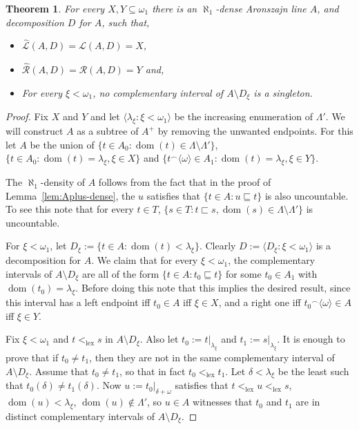 \documentclass[10pt]{amsart}
\newtheorem{theorem}{Theorem}[section]
\theoremstyle{definition}
\theoremstyle{remark}
\newcommand{\seb}{\subseteq}
\newcommand{\setm}{\setminus}
\newcommand{\tup}[1]{\langle#1\rangle}
\renewcommand{\L}{\mathscr{L}}
\newcommand{\R}{\mathscr{R}}
\newcommand{\La}{\hat{\L}}
\newcommand{\Ra}{\hat{\R}}
\newcommand\lex{\mathrm{lex}}
\newcommand{\1}{\mathbbm{1}}
\newcommand{\tleq}{\sqsubseteq}
\newcommand{\tle}{\sqsubset}
\DeclareMathOperator{\dom}{dom}
\begin{document}
\begin{theorem}\label{thm:L_R}
  For every $X,Y \seb \omega_{1}$ there is an $\aleph_{1}$-dense Aronszajn
  line $A$, and decomposition $D$ for $A$, such that,
  \begin{itemize}\itemsep0em
    \item $\La(A,D) = \L(A,D) = X$,
    \item $\Ra(A,D) = \R(A,D) = Y$ and,
    \item For every $\xi < \omega_{1}$, no complementary
    interval of $A \setm D_{\xi}$ is a singleton.
  \end{itemize}
\end{theorem}
\begin{proof}
  Fix $X$ and $Y$ and let $\tup{\lambda_{\xi} : \xi < \omega_{1}}$
  be the increasing enumeration of $\Lambda'$. We
  will construct $A$ as a subtree of $A^{+}$ by removing the unwanted
  endpoints. For this let $A$ be the union of
  $\{t \in A_{0} : \dom(t) \in \Lambda \setm \Lambda ' \}$,
  $\{t \in A_{0} : \dom(t) = \lambda_{\xi}, \xi \in X \}$ and
  $\{t^{\frown}\tup{\omega} \in A_{1} : \dom(t) = \lambda_{\xi}, \xi \in Y\}$.

  The $\aleph_{1}$-density of $A$ follows from the fact that
  in the proof of Lemma~\ref{lem:Aplus-dense}, the $u$ satisfies
  that $\{t \in A : u \tleq t\}$ is also uncountable. To see this note that
  for every $t \in T$, $\{s \in T : t \tle s, \dom(s) \in \Lambda \setm \Lambda'\}$
  is uncountable.

  For $\xi < \omega_{1}$, let $D_{\xi} := \{t \in A : \dom(t) < \lambda_{\xi}\}$.
  Clearly $D := \tup{D_{\xi} : \xi < \omega_{1}}$ is a decomposition for $A$.
  We claim that for every $\xi < \omega_{1}$, the complementary
  intervals of $A \setm D_{\xi}$ are all of the form
  $\{t \in A : t_{0} \tleq t\}$
  for some $t_{0} \in A_{1}$ with $\dom(t_{0}) = \lambda_{\xi}$. Before
  doing this note that this implies the desired result, since
  this interval has a left endpoint iff
  $t_{0} \in A$ iff $\xi \in X$, and a right one iff
  ${t_{0}}^{\frown}\tup{\omega} \in A$ iff $\xi \in Y$.

  Fix $\xi < \omega_{1}$ and $t <_{\lex} s$ in $A \setm D_{\xi}$. Also
  let $t_{0} := t|_{\lambda_{\xi}}$ and $t_{1} := s|_{\lambda_{\xi}}$. It is enough
  to prove that if $t_{0} \neq t_{1}$, then they are not in the same complementary
  interval of $A \setm D_{\xi}$. Assume that $t_{0} \neq t_{1}$, so that in
  fact $t_{0} <_{\lex} t_{1}$. Let $\delta < \lambda_{\xi}$ be the least
  such that $t_{0}(\delta) \neq t_{1}(\delta)$. Now
  $u:= t_{0}|_{\delta + \omega}$ satisfies that $t <_{\lex} u <_{\lex} s$,
  $\dom(u) < \lambda_{\xi}$, $\dom(u) \notin \Lambda'$, so $u \in A$
  witnesses that $t_{0}$ and $t_{1}$ are in distinct complementary intervals
  of $A \setm D_{\xi}$.
\end{proof}
\end{document}
